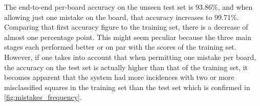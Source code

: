 \documentclass[../report.tex]{subfiles}
\begin{document}
The end-to-end per-board accuracy on the unseen test set is 93.86\%, and when allowing just one mistake on the board, that accuracy increases to 99.71\%.
Comparing that first accuracy figure to the training set, there is a decrease of almost one percentage point. 
This might seem peculiar because the three main stages each performed better or on par with the scores of the training set.
However, if one takes into account that when permitting one mistake per board, the accuracy on the test set is actually higher than that of the training set, it becomes apparent that the system had more incidences with two or more misclassified squares in the training set than the test set which is confirmed in \cref{fig:mistakes_frequency}.
\begin{figure}
\end{figure}
\end{document}
